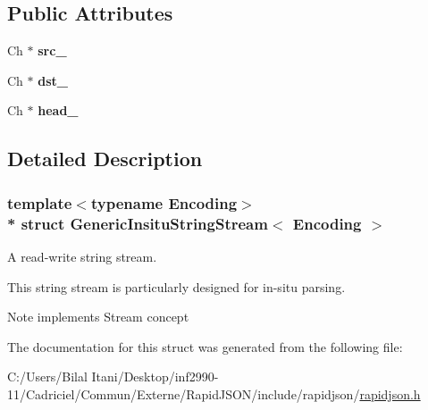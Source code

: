 \subsection*{Public Attributes}
\begin{DoxyCompactItemize}
\item 
Ch $\ast$ {\bfseries src\+\_\+}\hypertarget{struct_generic_insitu_string_stream_af3cc551dd07fcca39db84459f4d4e718}{}\label{struct_generic_insitu_string_stream_af3cc551dd07fcca39db84459f4d4e718}

\item 
Ch $\ast$ {\bfseries dst\+\_\+}\hypertarget{struct_generic_insitu_string_stream_ab0e7a73638a7a8db81aa9b26714b0e3b}{}\label{struct_generic_insitu_string_stream_ab0e7a73638a7a8db81aa9b26714b0e3b}

\item 
Ch $\ast$ {\bfseries head\+\_\+}\hypertarget{struct_generic_insitu_string_stream_af5a7116bdd9bfde5141c298a5b7566b0}{}\label{struct_generic_insitu_string_stream_af5a7116bdd9bfde5141c298a5b7566b0}

\end{DoxyCompactItemize}


\subsection{Detailed Description}
\subsubsection*{template$<$typename Encoding$>$\\*
struct Generic\+Insitu\+String\+Stream$<$ Encoding $>$}

A read-\/write string stream. 

This string stream is particularly designed for in-\/situ parsing. \begin{DoxyNote}{Note}
implements Stream concept 
\end{DoxyNote}


The documentation for this struct was generated from the following file\+:\begin{DoxyCompactItemize}
\item 
C\+:/\+Users/\+Bilal Itani/\+Desktop/inf2990-\/11/\+Cadriciel/\+Commun/\+Externe/\+Rapid\+J\+S\+O\+N/include/rapidjson/\hyperlink{rapidjson_8h}{rapidjson.\+h}\end{DoxyCompactItemize}

